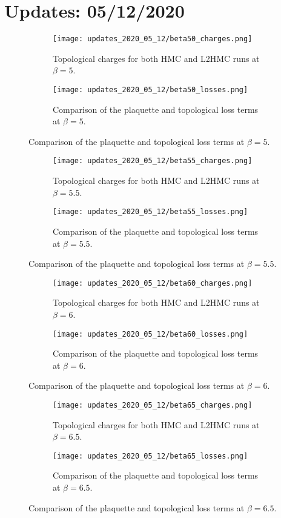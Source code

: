 \section{Updates: 05/12/2020}%
\label{sec:updates_2020_05_12}
%
\begin{figure}[htpb]
  \centering
  \begin{subfigure}[htpb]{0.775\textwidth}
    \texttt{[image: updates\_2020\_05\_12/beta50\_charges.png]}
    \caption{Topological charges for both HMC and L2HMC runs at \(\beta = 5\).}%
  \end{subfigure}
  \begin{subfigure}[htpb]{0.775\textwidth}
    \texttt{[image: updates\_2020\_05\_12/beta50\_losses.png]}
    \caption{Comparison of the plaquette and topological loss terms at \(\beta
    = 5\).}%
  \end{subfigure}
\end{figure}
%
\begin{figure}[htpb]
  \centering
  \begin{subfigure}[t]{0.8\textwidth}
    \texttt{[image: updates\_2020\_05\_12/beta55\_charges.png]}
    \caption{Topological charges for both HMC and L2HMC runs at \(\beta = 5.5\).}%
  \end{subfigure}
  \begin{subfigure}[t]{0.8\textwidth}
    \texttt{[image: updates\_2020\_05\_12/beta55\_losses.png]}
    \caption{Comparison of the plaquette and topological loss terms at \(\beta
    = 5.5\).}%
  \end{subfigure}
\end{figure}
%
\begin{figure}[htpb]
  \centering
  \begin{subfigure}[t]{0.8\textwidth}
    \texttt{[image: updates\_2020\_05\_12/beta60\_charges.png]}
    \caption{Topological charges for both HMC and L2HMC runs at \(\beta = 6\).}%
  \end{subfigure}
  \begin{subfigure}[t]{0.8\textwidth}
    \texttt{[image: updates\_2020\_05\_12/beta60\_losses.png]}
    \caption{Comparison of the plaquette and topological loss terms at \(\beta
    = 6\).}%
  \end{subfigure}
\end{figure}
%
\begin{figure}[htpb]
  \centering
  \begin{subfigure}[t]{0.8\textwidth}
    \texttt{[image: updates\_2020\_05\_12/beta65\_charges.png]}
    \caption{Topological charges for both HMC and L2HMC runs at \(\beta = 6.5\).}%
  \end{subfigure}
  \begin{subfigure}[t]{0.8\textwidth}
    \texttt{[image: updates\_2020\_05\_12/beta65\_losses.png]}
    \caption{Comparison of the plaquette and topological loss terms at \(\beta
    = 6.5\).}%
  \end{subfigure}
\end{figure}
